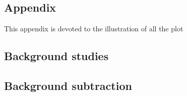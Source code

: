 %
\begin{appendices}

\chapter{Appendix}

This appendix is devoted to the illustration of all the plot 

%
\section*{Background studies} \label{app:bs}


\section*{Background subtraction} \label{app:bsub}


\end{appendices}